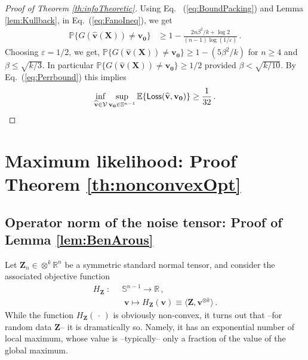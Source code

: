 \documentclass[11pt]{article}
\theoremstyle{definition}
\def\Loss{{\sf Loss}}
\def\<{\langle}
\def\>{\rangle}
\def\prob{{\mathbb P}}
\def\E{{\mathbb E}} %
\def\reals{\mathbb{R}}
\def\bv{\mathbf{v}}
\def\hbv{\mathbf{\widehat{v}}}
\def\bvz{\mathbf{v_0}}
\def\bX{\mathbf{X}}
\def\bZ{\mathbf{Z}}
\def\cV{\mathcal{V}}
\def\bbS{\mathbb{S}}
\def\E{\mathbb{E}}
\def\ok{{^{\otimes k}}}
\def\eps{\varepsilon}
\begin{document}
\begin{proof}[Proof of Theorem \ref{th:infoTheoretic}]
Using Eq. ~(\ref{eq:BoundPacking})  and Lemma \ref{lem:Kullback}, 
in Eq.~(\ref{eq:FanoIneq}), we get
%
\begin{align}
% 
   \prob\{G(\hbv(\bX)) \ne \bvz\} &\ge 1- \frac{2n\beta^2/k+\log
     2}{(n-1)\log(1/\eps)}\, .
%
\end{align}
%
Choosing $\eps=1/2$, we get, $\prob\{G(\hbv(\bX)) \ne \bvz\} \ge
1-(5\beta^2/k)$ for $n\ge 4$ and $\beta\le \sqrt{k/3}$.
In particular $\prob\{G(\hbv(\bX)) \ne \bvz\} \ge 1/2$ provided
$\beta<\sqrt{k/10}$. 
By Eq.~(\ref{eq:Perrbound}) this implies
%
\begin{align} 
\inf_{\hbv\in\cV}\sup_{\bvz \in
        \bbS^{n-1}}\E\{\Loss(\hbv, \bvz)\}\ge \frac{1}{32}\, .
\end{align}
%
\end{proof}
 
%
\section{Maximum likelihood: Proof
 Theorem \ref{th:nonconvexOpt}}
\label{sec:operatorNorm}
 
\subsection{Operator norm of the noise tensor: Proof
  of Lemma \ref{lem:BenArous}}
\label{sec:BenArous}

Let $\bZ_n \in\otimes^k\reals^n$ be a symmetric standard normal
tensor, and consider the associated objective function
%
\begin{align}
%
H_{\bZ}\; :& \;\;\bbS^{n-1}\to \reals\, ,\\
&\;\;\;\bv \mapsto H_{\bZ}(\bv) \equiv \<\bZ, \bv\ok\>\, .
%
\end{align}
%
While the function $H_{\bZ}(\,\cdot\,)$ is obviously non-convex, it
turns out that --for random data $\bZ$-- it is dramatically
so. Namely, it has an exponential number of local maximum, whose value
is --typically-- only a fraction of the value of the global maximum.
\end{document}
